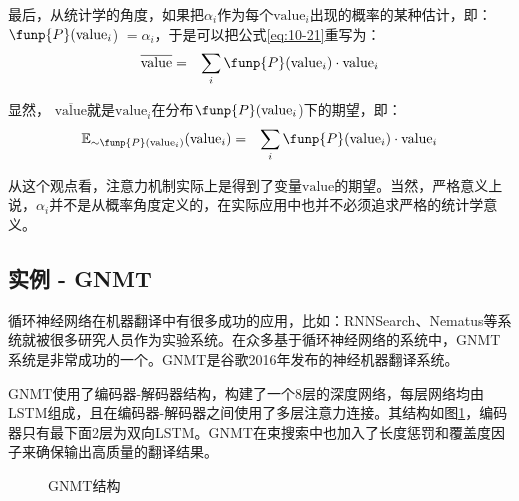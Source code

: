 \parinterval 最后，从统计学的角度，如果把$\alpha_i$作为每个$\mathrm{value}_i$出现的概率的某种估计，即：$ \funp{P} (\mathrm{value}_i$) $= \alpha_i$，于是可以把公式\eqref{eq:10-21}重写为：
\begin{eqnarray}
\overline{\mathrm{value}} &=& \sum_i \funp{P} ( {\mathrm{value}}_i) \cdot {\mathrm{value}}_i
\label{eq:10-22}
\end{eqnarray}

\noindent 显然， $\overline{\mathrm{value}}$就是$\mathrm{value}_i$在分布$ \funp{P}( \mathrm{value}_i$)下的期望，即：
\begin{eqnarray}
\mathbb{E}_{\sim \funp{P} ( {\mathrm{\mathrm{value}}}_i )} ({\mathrm{value}}_i) &=& \sum_i \funp{P} ({\mathrm{value}}_i) \cdot {\mathrm{value}}_i
\label{eq:10-23}
\end{eqnarray}

从这个观点看，注意力机制实际上是得到了变量$\mathrm{value}$的期望。当然，严格意义上说，$\alpha_i$并不是从概率角度定义的，在实际应用中也并不必须追求严格的统计学意义。

\subsection{实例 - GNMT}
\vspace{0.5em}

\parinterval 循环神经网络在机器翻译中有很多成功的应用，比如：RNNSearch、Nematus等系统就被很多研究人员作为实验系统。在众多基于循环神经网络的系统中，GNMT系统是非常成功的一个。GNMT是谷歌2016年发布的神经机器翻译系统。

\parinterval GNMT使用了编码器-解码器结构，构建了一个8层的深度网络，每层网络均由LSTM组成，且在编码器-解码器之间使用了多层注意力连接。其结构如图\ref{fig:10-24}，编码器只有最下面2层为双向LSTM。GNMT在束搜索中也加入了长度惩罚和覆盖度因子来确保输出高质量的翻译结果。
\vspace{0.5em}

\begin{figure}[htp]
\centering

\caption{GNMT结构}
\label{fig:10-24}
\end{figure}

